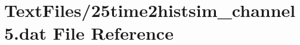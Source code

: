 \hypertarget{25time2histsim__channel5_8dat}{}\section{Text\+Files/25time2histsim\+\_\+channel5.dat File Reference}
\label{25time2histsim__channel5_8dat}

